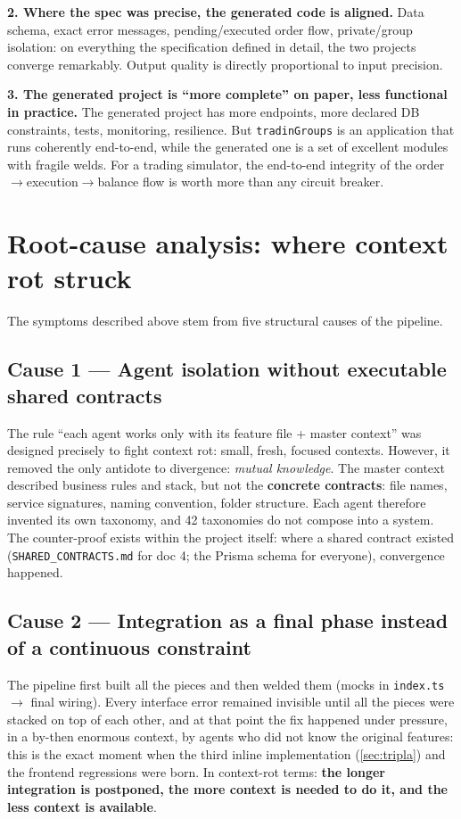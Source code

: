 \documentclass[11pt,a4paper]{article}
\newcommand{\file}[1]{\texttt{\small #1}}
\begin{document}
\textbf{2. Where the spec was precise, the generated code is aligned.} Data schema, exact error messages, pending/executed order flow, private/group isolation: on everything the specification defined in detail, the two projects converge remarkably. Output quality is directly proportional to input precision.

\textbf{3. The generated project is ``more complete'' on paper, less functional in practice.} The generated project has more endpoints, more declared DB constraints, tests, monitoring, resilience. But \file{tradinGroups} is an application that runs coherently end-to-end, while the generated one is a set of excellent modules with fragile welds. For a trading simulator, the end-to-end integrity of the order$\to$execution$\to$balance flow is worth more than any circuit breaker.

\section{Root-cause analysis: where context rot struck}

The symptoms described above stem from five structural causes of the pipeline.

\subsection{Cause 1 --- Agent isolation without executable shared contracts}
The rule ``each agent works only with its feature file + master context'' was designed precisely to fight context rot: small, fresh, focused contexts. However, it removed the only antidote to divergence: \emph{mutual knowledge}. The master context described business rules and stack, but not the \textbf{concrete contracts}: file names, service signatures, naming convention, folder structure. Each agent therefore invented its own taxonomy, and 42 taxonomies do not compose into a system. The counter-proof exists within the project itself: where a shared contract existed (\file{SHARED\_CONTRACTS.md} for doc 4; the Prisma schema for everyone), convergence happened.

\subsection{Cause 2 --- Integration as a final phase instead of a continuous constraint}
The pipeline first built all the pieces and then welded them (mocks in \file{index.ts} $\to$ final wiring). Every interface error remained invisible until all the pieces were stacked on top of each other, and at that point the fix happened under pressure, in a by-then enormous context, by agents who did not know the original features: this is the exact moment when the third inline implementation (\ref{sec:tripla}) and the frontend regressions were born. In context-rot terms: \textbf{the longer integration is postponed, the more context is needed to do it, and the less context is available}.
\end{document}
